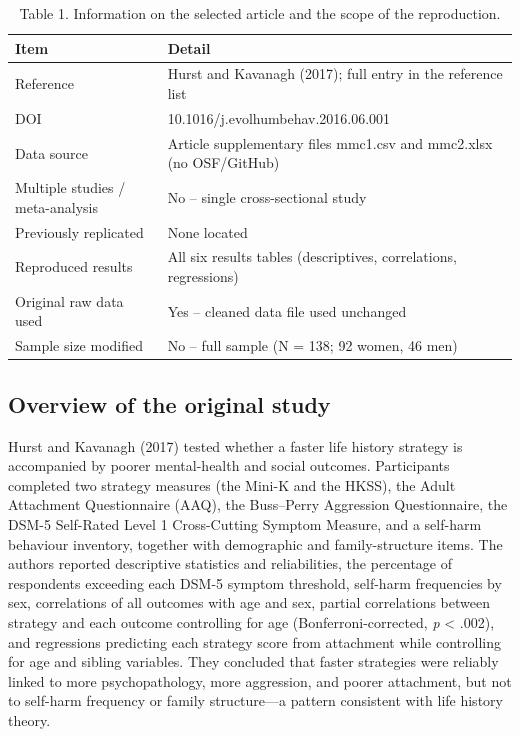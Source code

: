 \documentclass[
  english,
  man,floatsintext]{apa6}
\begin{document}
\begin{table}[tbp]

\begin{center}
\begin{threeparttable}

\caption{\label{tab:tab-litinfo}Table 1. Information on the selected article and the scope of the reproduction.}

\small{

\begin{tabular}{ll}
\toprule
Item & Detail\\
\midrule
Reference & Hurst and Kavanagh (2017); full entry in the reference list\\
DOI & 10.1016/j.evolhumbehav.2016.06.001\\
Data source & Article supplementary files mmc1.csv and mmc2.xlsx (no OSF/GitHub)\\
Multiple studies / meta-analysis & No -- single cross-sectional study\\
Previously replicated & None located\\
Reproduced results & All six results tables (descriptives, correlations, regressions)\\
Original raw data used & Yes -- cleaned data file used unchanged\\
Sample size modified & No -- full sample (N = 138; 92 women, 46 men)\\
\bottomrule
\end{tabular}

}

\end{threeparttable}
\end{center}

\end{table}

\subsection{Overview of the original study}\label{overview-of-the-original-study}

Hurst and Kavanagh (2017) tested whether a faster life history strategy is accompanied by poorer mental-health and social outcomes. Participants completed two strategy measures (the Mini-K and the HKSS), the Adult Attachment Questionnaire (AAQ), the Buss--Perry Aggression Questionnaire, the DSM-5 Self-Rated Level 1 Cross-Cutting Symptom Measure, and a self-harm behaviour inventory, together with demographic and family-structure items. The authors reported descriptive statistics and reliabilities, the percentage of respondents exceeding each DSM-5 symptom threshold, self-harm frequencies by sex, correlations of all outcomes with age and sex, partial correlations between strategy and each outcome controlling for age (Bonferroni-corrected, \emph{p} \textless{} .002), and regressions predicting each strategy score from attachment while controlling for age and sibling variables. They concluded that faster strategies were reliably linked to more psychopathology, more aggression, and poorer attachment, but not to self-harm frequency or family structure---a pattern consistent with life history theory.
\end{document}
